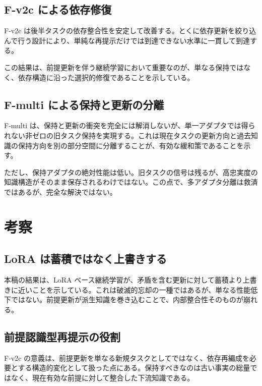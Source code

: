 \documentclass[12pt,a4paper]{article}
\begin{document}
\subsection{F-v2c による依存修復}\label{f-v2c-ux306bux3088ux308bux4f9dux5b58ux4feeux5fa9}

F-v2c は後半タスクの依存整合性を安定して改善する。とくに依存更新を絞り込んで行う設計により、単純な再提示だけでは到達できない水準に一貫して到達する。

この結果は、前提更新を伴う継続学習において重要なのが、単なる保持ではなく、依存構造に沿った選択的修復であることを示している。

\subsection{F-multi による保持と更新の分離}\label{f-multi-ux306bux3088ux308bux4fddux6301ux3068ux66f4ux65b0ux306eux5206ux96e2}

F-multi は、保持と更新の衝突を完全には解消しないが、単一アダプタでは得られない非ゼロの旧タスク保持を実現する。これは現在タスクの更新方向と過去知識の保持方向を別の部分空間に分離することが、有効な緩和策であることを示す。

ただし、保持アダプタの絶対性能は低い。旧タスクの信号は残るが、高忠実度の知識構造がそのまま保存されるわけではない。この点で、多アダプタ分離は救済ではあるが、完全な解決ではない。

\section{考察}\label{ux8003ux5bdf}

\subsection{LoRA は蓄積ではなく上書きする}\label{lora-ux306fux84c4ux7a4dux3067ux306fux306aux304fux4e0aux66f8ux304dux3059ux308b}

本稿の結果は、LoRA ベース継続学習が、矛盾を含む更新に対して蓄積より上書きに近いことを示している。これは破滅的忘却の一種ではあるが、単なる性能低下ではない。前提更新が派生知識を巻き込むことで、内部整合性そのものが崩れる。

\subsection{前提認識型再提示の役割}\label{ux524dux63d0ux8a8dux8b58ux578bux518dux63d0ux793aux306eux5f79ux5272}

F-v2c の意義は、前提更新を単なる新規タスクとしてではなく、依存再編成を必要とする構造的変化として扱った点にある。保持すべきなのは古い事実の総量ではなく、現在有効な前提に対して整合した下流知識である。
\end{document}
